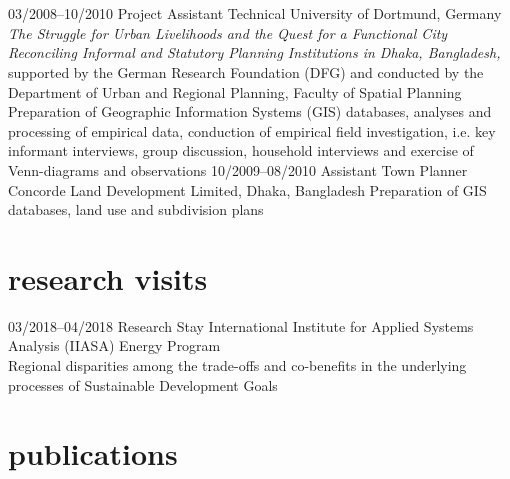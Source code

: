 \documentclass[]{friggeri-cv} %
\begin{document}
\section{}
\begin{entrylist}
\entry
{\small{03/2008--10/2010}}
{Project Assistant}
{Technical University of Dortmund, Germany}
{{\emph{The Struggle for Urban Livelihoods and the Quest for a Functional City Reconciling Informal and Statutory Planning Institutions in Dhaka, Bangladesh,}} supported by the German Research Foundation (DFG) and conducted by the Department of Urban and Regional Planning, Faculty of Spatial Planning\\
Preparation of Geographic Information Systems (GIS) databases, analyses and processing of empirical data, conduction of empirical field investigation, i.e. key informant interviews, group discussion, household interviews and exercise of Venn-diagrams and observations}
\entry
{\small{10/2009--08/2010}}
{Assistant Town Planner}
{Concorde Land Development Limited, Dhaka, Bangladesh}
{Preparation of GIS databases, land use and subdivision plans}
\end{entrylist}

\section{research visits}

\begin{entrylist}
\entry
{\small{03/2018--04/2018}}
{Research Stay}
{International Institute for Applied Systems Analysis (IIASA)}
{Energy Program \\
Regional disparities among the trade-offs and co-benefits in the underlying processes of Sustainable Development Goals}
\end{entrylist}

\section{publications}
\end{document}
